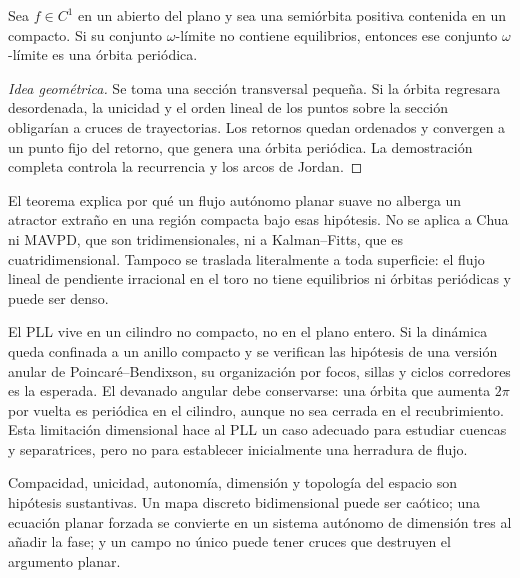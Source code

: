 \begin{proposition}
Sea \(f\in C^1\) en un abierto del plano y sea una semiórbita positiva
contenida en un compacto. Si su conjunto \(\omega\)-límite no contiene
equilibrios, entonces ese conjunto \(\omega\)-límite es una órbita periódica.
\end{proposition}

\begin{proof}[Idea geométrica]
Se toma una sección transversal pequeña. Si la órbita regresara desordenada,
la unicidad y el orden lineal de los puntos sobre la sección obligarían a
cruces de trayectorias. Los retornos quedan ordenados y convergen a un punto
fijo del retorno, que genera una órbita periódica. La demostración completa
controla la recurrencia y los arcos de Jordan.
\end{proof}

El teorema explica por qué un flujo autónomo planar suave no alberga un
atractor extraño en una región compacta bajo esas hipótesis. No se aplica a
Chua ni MAVPD, que son tridimensionales, ni a Kalman--Fitts, que es
cuatridimensional. Tampoco se traslada literalmente a toda superficie: el
flujo lineal de pendiente irracional en el toro no tiene equilibrios ni
órbitas periódicas y puede ser denso.

El PLL vive en un cilindro no compacto, no en el plano entero. Si la dinámica
queda confinada a un anillo compacto y se verifican las hipótesis de una
versión anular de Poincaré--Bendixson, su organización por focos, sillas y
ciclos corredores es la esperada. El devanado angular debe conservarse: una
órbita que aumenta \(2\pi\) por vuelta es periódica en el cilindro, aunque no
sea cerrada en el recubrimiento. Esta limitación dimensional hace al PLL un
caso adecuado para estudiar cuencas y separatrices, pero no para establecer
inicialmente una herradura de flujo.

\begin{remark}
Compacidad, unicidad, autonomía, dimensión y topología del espacio son
hipótesis sustantivas. Un mapa discreto bidimensional puede ser caótico; una
ecuación planar forzada se convierte en un sistema autónomo de dimensión tres
al añadir la fase; y un campo no único puede tener cruces que destruyen el
argumento planar.
\end{remark}

\fi
\HAFOGeoRenderBlocktrue
\ifdefined\HAFOGeoBlockSelect
  \HAFOGeoRenderBlockfalse
  \ifdefined\HAFOGeoBlockChaos\HAFOGeoRenderBlocktrue\fi
\fi
\ifHAFOGeoRenderBlock
\HAFOStudyNeedspace
